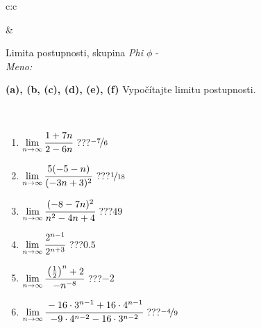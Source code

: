 \documentclass[10pt]{report}
\begin{document}
\begin{tabular}{c:c}
\begin{minipage}[c][104.5mm][t]{0.5\linewidth}
\begin{center}
\begin{minipage}{0.20\linewidth}
\begin{center}
\end{center}
\end{minipage}
\end{center}
\end{minipage}
&
\begin{minipage}[c][104.5mm][t]{0.5\linewidth}
\begin{center}
\vspace{5mm}
{\huge Limita postupnosti, skupina \textit{Phi $\phi$} -}\\[5mm]
\textit{Meno:}\phantom{xxxxxxxxxxxxxxxxxxxxxxxxxxxxxxxxxxxxxxxxxxxxxxxxxxxxxxxxxxxxxxxxx}\\[5mm]
\begin{minipage}{0.95\linewidth}
\begin{center}
{
\textbf{(a), (b, (c), (d), (e), (f)} Vypočítajte limitu postupnosti. \\[-1mm]
\phantom{x}
}
\end{center}
\end{minipage}
\\[1mm]
\begin{minipage}{0.79\linewidth}
\begin{center}
\begin{varwidth}{\linewidth}
\setlength{\itemsep}{0pt}
\begin{enumerate}
\normalsize
\item $\lim\limits_{n\to\infty}\cfrac{1+7n}{2-6n}$\quad \dotfill\; ???\;\dotfill \quad $\nicefrac{-7}{6}$
\item $\lim\limits_{n\to\infty}\cfrac{5(-5-n)}{(-3n+3)^2}$\quad \dotfill\; ???\;\dotfill \quad $\nicefrac{1}{18}$
\item $\lim\limits_{n\to\infty}\cfrac{(-8-7n)^2}{n^2-4n+4}$\quad \dotfill\; ???\;\dotfill \quad $49$
\item $\lim\limits_{n\to\infty}\cfrac{2^{n-1}}{2^{n+3}}$\quad \dotfill\; ???\;\dotfill \quad $0.5$
\item $\lim\limits_{n\to\infty}\cfrac{\left(\frac{1}{2}\right)^n +2}{-n^{-8}}$\quad \dotfill\; ???\;\dotfill \quad $-2$
\item $\lim\limits_{n\to\infty}\cfrac{-16\cdot 3^{n-1}+16\cdot 4^{n-1}}{-9\cdot 4^{n-2}-16\cdot 3^{n-2}}$\quad \dotfill\; ???\;\dotfill \quad $\nicefrac{-4}{9}$
\end{enumerate}
\end{varwidth}
\end{center}
\end{minipage}
\begin{minipage}{0.20\linewidth}

\end{minipage}
\end{center}
\end{minipage}
\end{tabular}
\end{document}
